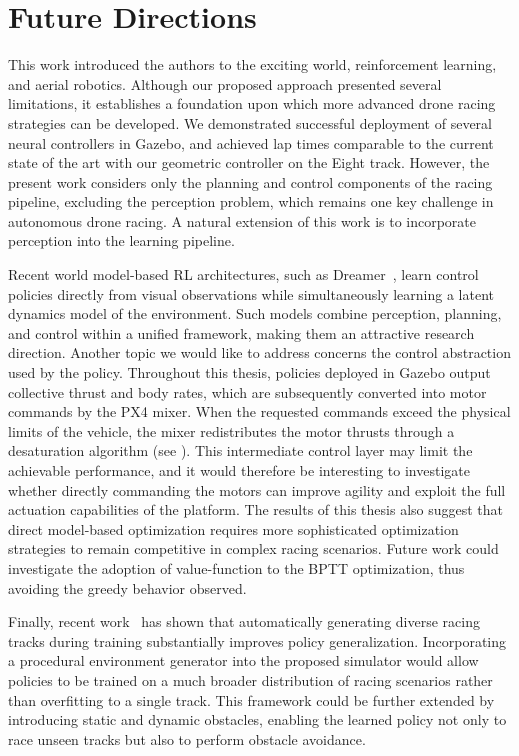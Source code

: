 
\chapter{Future Directions}\label{chap:fut_dir}


This work introduced the authors to the exciting world, reinforcement learning, and aerial robotics.
Although our proposed approach presented several limitations, it establishes a foundation upon which more advanced drone racing strategies can be developed.
We demonstrated successful deployment of several neural controllers in Gazebo, and achieved lap times comparable to the current state of the art with our geometric controller on the Eight track.
However, the present work considers only the planning and control components of the racing pipeline, excluding the perception problem, which remains one key challenge in autonomous drone racing.
A natural extension of this work is to incorporate perception into the learning pipeline.

Recent world model-based \ac{RL} architectures, such as Dreamer~\cite{hafner_mastering_2024,verraest_skydreamer_2025,romero_dream_2025}, learn control policies directly from visual observations while simultaneously learning a latent dynamics model of the environment.
Such models combine perception, planning, and control within a unified framework, making them an attractive research direction.
Another topic we would like to address concerns the control abstraction used by the policy.
Throughout this thesis, policies deployed in Gazebo output collective thrust and body rates, which are subsequently converted into motor commands by the PX4 mixer.
When the requested commands exceed the physical limits of the vehicle, the mixer redistributes the motor thrusts through a desaturation algorithm (see ).
This intermediate control layer may limit the achievable performance, and it would therefore be interesting to investigate whether directly commanding the motors can improve agility and exploit the full actuation capabilities of the platform.
The results of this thesis also suggest that direct model-based optimization requires more sophisticated optimization strategies to remain competitive in complex racing scenarios.
Future work could investigate the adoption of value-function to the \ac{BPTT} optimization, thus avoiding the greedy behavior observed.

Finally, recent work~\cite{green_bridging_2026} has shown that automatically generating diverse racing tracks during training substantially improves policy generalization.
Incorporating a procedural environment generator into the proposed simulator would allow policies to be trained on a much broader distribution of racing scenarios rather than overfitting to a single track.
This framework could be further extended by introducing static and dynamic obstacles, enabling the learned policy not only to race unseen tracks but also to perform obstacle avoidance.